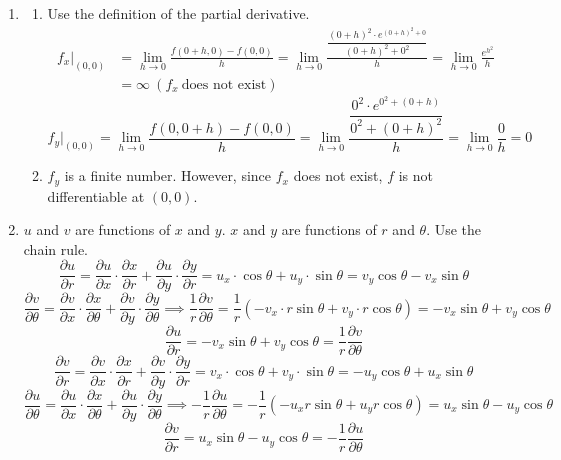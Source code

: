 \documentclass[a4paper, 12pt]{article}
\begin{document}
\begin{enumerate}[leftmargin=*,label=\textbf{\arabic*.}]
Using the definition $\mathbf{n}\cdot\overrightarrow{PP_1}=0$, where $P$ is a point on the plane, the equation of the plane is
\begin{align*}\mathbf{n}\cdot\overrightarrow{PP_1}=0&\implies\left\langle-4,-2,5\right\rangle\cdot\left\langle x-3,\,y-3,\,z-3\right\rangle=0\\[1em]&\implies-4(x-3)-2(y-3)+5(z-3)=0\implies\boxed{-4x-2y+5z+3=0}\end{align*}

\item \begin{enumerate}[leftmargin=*,label=\textbf{\alph*.}]
\item Use the definition of the partial derivative.
\begin{align*}f_x|_{(0,0)}&=\lim_{h\to0}\frac{f(0+h,0)-f(0,0)}h=\lim_{h\to0}\frac{\dfrac{(0+h)^2\cdot{e}^{(0+h)^2+0}}{(0+h)^2+0^2}}{h}=\lim_{h\to0}\frac{{e}^{h^2}}{h}\\[1em]&=\infty\:(f_x\:\text{does not exist})\end{align*}
\[f_y|_{(0,0)}=\lim_{h\to0}\frac{f(0,0+h)-f(0,0)}h=\lim_{h\to0}\frac{\dfrac{0^2\cdot{e}^{0^2+(0+h)}}{0^2+(0+h)^2}}{h}=\lim_{h\to0}\frac{0}{h}=0\]

\item $f_y$ is a finite number. However, since $f_x$ does not exist, $f$ is not differentiable at $(0,0)$.
\end{enumerate}

\item $u$ and $v$ are functions of $x$ and $y$. $x$ and $y$ are functions of $r$ and $\theta$. Use the chain rule.
\[\frac{\partial u}{\partial r}=\frac{\partial u}{\partial x}\cdot\frac{\partial x}{\partial r}+\frac{\partial u}{\partial y}\cdot\frac{\partial y}{\partial r}=u_x\cdot\cos\theta+u_y\cdot\sin\theta=v_y\cos\theta-v_x\sin\theta\]
\[\frac{\partial v}{\partial\theta}=\frac{\partial v}{\partial x}\cdot\frac{\partial x}{\partial\theta}+\frac{\partial v}{\partial y}\cdot\frac{\partial y}{\partial\theta}\implies\frac1r\frac{\partial v}{\partial\theta}=\frac1r\left(-v_x\cdot r\sin\theta+v_y\cdot r\cos\theta\right)=-v_x\sin\theta+v_y\cos\theta\]
\[\frac{\partial u}{\partial r}=-v_x\sin\theta+v_y\cos\theta=\frac1r\frac{\partial v}{\partial\theta}\]
\[\frac{\partial v}{\partial r}=\frac{\partial v}{\partial x}\cdot\frac{\partial x}{\partial r}+\frac{\partial v}{\partial y}\cdot\frac{\partial y}{\partial r}=v_x\cdot\cos\theta+v_y\cdot\sin\theta=-u_y\cos\theta+u_x\sin\theta\]
\[\frac{\partial u}{\partial\theta}=\frac{\partial u}{\partial x}\cdot\frac{\partial x}{\partial\theta}+\frac{\partial u}{\partial y}\cdot\frac{\partial y}{\partial\theta}\implies-\frac1r\frac{\partial u}{\partial\theta}=-\frac1r\left(-u_x r\sin\theta+u_y r\cos\theta\right)=u_x\sin\theta-u_y\cos\theta\]
\[\frac{\partial v}{\partial r}=u_x\sin\theta-u_y\cos\theta=-\frac1r\frac{\partial u}{\partial \theta}\]


\end{enumerate}
\end{document}
